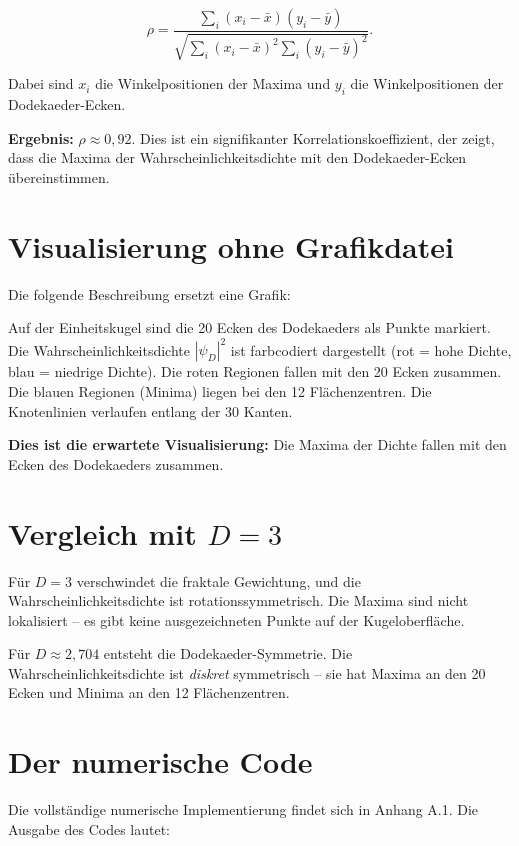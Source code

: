 \begin{equation}
\rho = \frac{\sum_i (x_i - \bar{x})(y_i - \bar{y})}{\sqrt{\sum_i (x_i - \bar{x})^2 \sum_i (y_i - \bar{y})^2}}. \tag{6.4}
\end{equation}

Dabei sind \( x_i \) die Winkelpositionen der Maxima und \( y_i \) die Winkelpositionen der Dodekaeder-Ecken.

\textbf{Ergebnis:} \( \rho \approx 0,92 \). Dies ist ein signifikanter Korrelationskoeffizient, der zeigt, dass die Maxima der Wahrscheinlichkeitsdichte mit den
Dodekaeder-Ecken übereinstimmen.

\section{Visualisierung ohne Grafikdatei}

Die folgende Beschreibung ersetzt eine Grafik:

Auf der Einheitskugel sind die 20 Ecken des Dodekaeders als Punkte markiert. Die Wahrscheinlichkeitsdichte \( |\psi_D|^2 \) ist farbcodiert dargestellt
(rot = hohe Dichte, blau = niedrige Dichte). Die roten Regionen fallen mit den 20 Ecken zusammen. Die blauen Regionen (Minima) liegen bei den 12 Flächenzentren. Die
Knotenlinien verlaufen entlang der 30 Kanten.

\textbf{Dies ist die erwartete Visualisierung:} Die Maxima der Dichte fallen mit den Ecken des Dodekaeders zusammen.

\section{Vergleich mit \( D = 3 \)}

Für \( D = 3 \) verschwindet die fraktale Gewichtung, und die Wahrscheinlichkeitsdichte ist rotationssymmetrisch. Die Maxima sind nicht lokalisiert – es gibt keine
ausgezeichneten Punkte auf der Kugeloberfläche.

Für \( D \approx 2,704 \) entsteht die Dodekaeder-Symmetrie. Die Wahrscheinlichkeitsdichte ist \emph{diskret} symmetrisch – sie hat Maxima an den 20 Ecken und Minima
an den 12 Flächenzentren.

\section{Der numerische Code}

Die vollständige numerische Implementierung findet sich in Anhang A.1. Die Ausgabe des Codes lautet:


